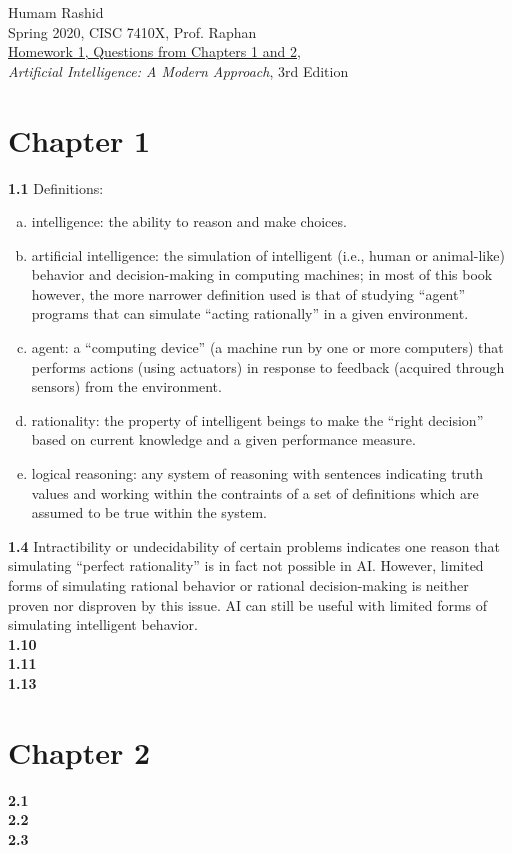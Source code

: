\documentclass{scrartcl}
\begin{document}
\begin{flushleft}
Humam Rashid\\
Spring 2020, CISC 7410X, Prof. Raphan\\
\underline{Homework 1, Questions from Chapters 1 and 2,}\\
\textit{Artificial Intelligence: A Modern Approach}, 3rd Edition
\end{flushleft}

\section*{Chapter 1}
\textbf{1.1} Definitions:
\begin{enumerate}[(a)]
    \item intelligence: the ability to reason and make choices.
    \item artificial intelligence: the simulation of intelligent (i.e., human or animal-like)
        behavior and decision-making in computing machines; in most of this book however, the more
        narrower definition used is that of studying ``agent'' programs that can simulate
        ``acting rationally'' in a given environment.
    \item agent: a ``computing device'' (a machine run by one or more computers) that performs
        actions (using actuators) in response to feedback (acquired through sensors) from the
        environment.
    \item rationality: the property of intelligent beings to make the ``right decision'' based on
        current knowledge and a given performance measure.
    \item logical reasoning: any system of reasoning with sentences indicating truth values and
        working within the contraints of a set of definitions which are assumed to be true within
        the system.
\end{enumerate}
\textbf{1.4} Intractibility or undecidability of certain problems indicates one reason that
        simulating ``perfect rationality'' is in fact not possible in AI. However, limited forms of
        simulating rational behavior or rational decision-making is neither proven nor disproven by
        this issue. AI can still be useful with limited forms of simulating intelligent behavior.
\bigskip
\\
\textbf{1.10}
\bigskip
\\
\textbf{1.11}
\bigskip
\\
\textbf{1.13}
\section*{Chapter 2}
\textbf{2.1}
\bigskip
\\
\textbf{2.2}
\bigskip
\\
\textbf{2.3}
\end{document}
